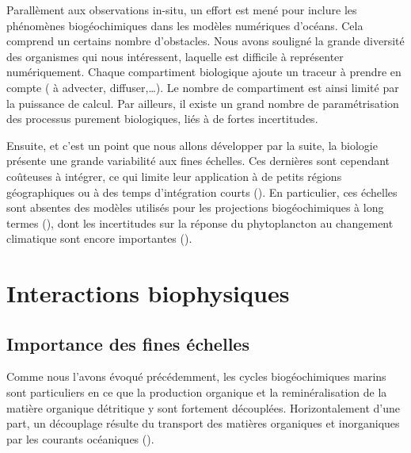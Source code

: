 Parallèment aux observations in-situ, un effort est mené pour inclure les phénomènes biogéochimiques dans les modèles numériques d'océans.
Cela comprend un certains nombre d'obstacles.
Nous avons souligné la grande diversité des organismes qui nous intéressent, laquelle est difficile à représenter numériquement.
Chaque compartiment biologique ajoute un traceur à prendre en compte ( à advecter, diffuser,\dots). Le nombre de compartiment est ainsi limité par la puissance de calcul.
Par ailleurs, il existe un grand nombre de paramétrisation des processus purement biologiques, liés à de fortes incertitudes.

Ensuite, et c'est un point que nous allons développer par la suite, la biologie présente une grande variabilité aux fines échelles.
Ces dernières sont cependant coûteuses à intégrer, ce qui limite leur application à de petits régions géographiques ou à des temps d'intégration courts (\cite{kessouri_2020,hewitt_2022}).
En particulier, ces échelles sont absentes des modèles utilisés pour les projections biogéochimiques à long termes (\cite{bopp_2013}), dont les incertitudes sur la réponse du phytoplancton au changement climatique sont encore importantes (\cite{kwiatkowski_2020}).



\section{Interactions biophysiques}
\label{sec:interactions-biophys}

\subsection{Importance des fines échelles}

Comme nous l'avons évoqué précédemment, les cycles biogéochimiques marins sont particuliers en ce que la production organique et la reminéralisation de la matière organique détritique y sont fortement découplées.
Horizontalement d'une part, un découplage résulte du transport des matières organiques et inorganiques par les courants océaniques (\cite{chabert_2021}).

